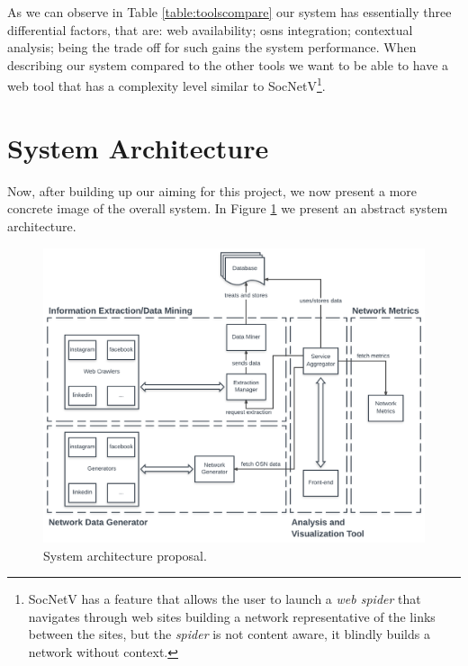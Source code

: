 As we can observe in Table \ref{table:toolscompare} our system has essentially three differential factors, that are: web availability; \glspl{osn} integration; contextual analysis; being the trade off for such gains the system performance. When describing our system compared to the other tools we want to be able to have a web tool that has a complexity level similar to SocNetV\footnote{\label{socnetv-footnote}SocNetV has a feature that allows the user to launch a \textit{web spider} that navigates through web sites building a network representative of the links between the sites, but the \textit{spider} is not content aware, it blindly builds a network without context.}.

\section{System Architecture}

Now, after building up our aiming for this project, we now present a more concrete image of the overall system. In Figure \ref{img:architectureprop} we present an abstract system architecture.

\begin{figure}[h!]
\begin{center}
  \hspace*{-0.8in}
  \includegraphics[width=1.2\textwidth]{img/architecture_v3.png}
\end{center}
\caption{\label{img:architectureprop} System architecture proposal.}
\end{figure}

